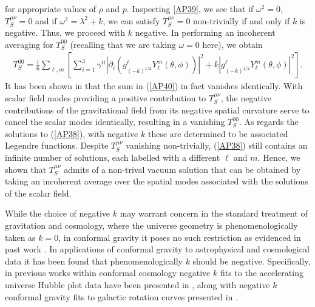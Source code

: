 for appropriate values of $\rho$ and $p$. Inspecting \eqref{AP39}, we see that if $\omega^2=0$, $T^{\mu\nu}_S=0$ and if $\omega^2=\lambda^2+k$, we can satisfy $T^{\mu\nu}_S=0$ non-trivially if and only if $k$ is negative. Thus, we proceed with $k$ negative. In performing an incoherent averaging for $T^{00}_S$ (recalling that we are taking $\omega =0$ here), we obtain \cite{mannheim_2000}
%
\begin{eqnarray}
T_S^{00}=\frac{1}{6}\sum_{\ell,m}\left[\sum _{i=1}^3\gamma^{ii}|\partial_i(g^{\ell}_{(-k)^{1/2}}Y^{m}_{\ell}(\theta,\phi))|^2+k|g^{\ell}_{(-k)^{1/2}}Y^{m}_{\ell}(\theta,\phi)|^2\right].
\label{AP40}
\end{eqnarray}
%
It has been shown in \cite{mannheim_2000} that the sum in (\ref{AP40}) in fact vanishes identically. With scalar field modes providing a positive contribution to $T^{\mu\nu}_S$, the negative contributions of the gravitational field from its negative spatial curvature serve to cancel the scalar modes identically, resulting in a vanishing $T^{00}_S$.
As regards the solutions to (\ref{AP38}), with negative $k$ these are determined to be associated Legendre functions. Despite $T^{\mu\nu}_S$ vanishing non-trivially, (\ref{AP38}) still contains an infinite number of solutions, each labelled with a different $\ell$ and $m$. Hence, we shown that $T^{\mu\nu}_S$ admits of a non-trival vacuum solution that can be obtained by taking an incoherent average over the spatial modes associated with the solutions of the scalar field.

While the choice of negative $k$ may warrant concern in the standard treatment of gravitation and cosmology, where the universe geometry is phenomenologically taken as $k=0$, in conformal gravity it poses no such restriction as evidenced in past work \cite{mannheim_obrien_2012,mannheim_obrien_2011,obrien_mannheim_2012,mannheim_kazanas_1988,mannheim_kazanas_1989,mannheim_kazanas_1994}. In applications of conformal gravity to astrophysical and cosmological data it has been found that phenomenologically $k$ should be negative. Specifically, in previous works within conformal cosmology negative $k$ fits to the accelerating universe Hubble plot data have been presented in \cite{mannheim_2006,mannheim_2017}, along with negative $k$ conformal gravity fits to galactic rotation curves  presented in \cite{mannheim_2006,mannheim_2017}.

